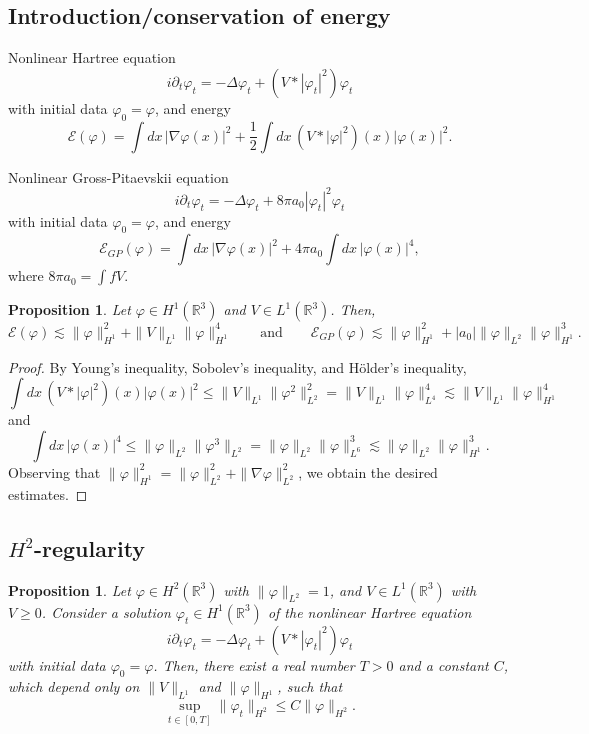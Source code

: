 \documentclass[11pt,a4paper]{scrartcl}
\newtheorem{prp}[thm]{Proposition}
\newcommand{\R}{\mathds{R}}
\begin{document}
\subsection{Introduction/conservation of energy}


Nonlinear Hartree equation
\[
  i \partial_t \varphi_t = - \Delta \varphi_t + (V * |\varphi_t|^2) \varphi_t
\]
with initial data $\varphi_0 = \varphi$, and energy
\[
  \mathcal{E}(\varphi) = \int dx \, |\nabla \varphi(x)|^2 + \frac{1}{2} \int
  dx \, (V * |\varphi|^2)(x) |\varphi(x)|^2.
\]


Nonlinear Gross-Pitaevskii equation
\[
  i \partial_t \varphi_t = - \Delta \varphi_t + 8 \pi a_0 |\varphi_t|^2
  \varphi_t
\]
with initial data $\varphi_0 = \varphi$, and energy
\[
  \mathcal{E}_{GP}(\varphi) = \int dx \, |\nabla \varphi(x)|^2 + 4 \pi a_0
  \int dx \, |\varphi(x)|^4,
\]
where $8 \pi a_0 = \int f V$.


\begin{prp} \label{p:energy}
  Let $\varphi \in H^1(\R^3)$ and $V \in L^1(\R^3)$. Then,
  \[
    \mathcal{E}(\varphi) \apprle \| \varphi \|_{H^1}^2 + \| V \|_{L^1} \|
    \varphi \|_{H^1}^4 \qquad \text{and} \qquad \mathcal{E}_{GP}(\varphi)
    \apprle \| \varphi \|_{H^1}^2 + |a_0| \| \varphi \|_{L^2} \| \varphi
    \|_{H^1}^3.
  \]
\end{prp}


\begin{proof}
  By Young's inequality, Sobolev's inequality, and H\"older's inequality, 
  \[
    \int dx \, (V * |\varphi|^2)(x) |\varphi(x)|^2 \le \| V \|_{L^1} \|
    \varphi^2 \|_{L^2}^2 = \| V \|_{L^1} \| \varphi \|_{L^4}^4 \apprle \| V
    \|_{L^1} \| \varphi \|_{H^1}^4
  \]
  and
  \[
    \int dx \, |\varphi(x)|^4 \le \| \varphi \|_{L^2} \| \varphi^3 \|_{L^2} =
    \| \varphi \|_{L^2} \| \varphi \|_{L^6}^3 \apprle \| \varphi \|_{L^2} \|
    \varphi \|_{H^1}^3.
  \]
  Observing that $\| \varphi \|_{H^1}^2 = \| \varphi \|_{L^2}^2 + \| \nabla
  \varphi \|_{L^2}^2$, we obtain the desired estimates.
\end{proof}


\subsection{$H^2$-regularity}


\begin{prp} \label{p:reg1}
  Let $\varphi \in H^2(\R^3)$ with $\| \varphi \|_{L^2} = 1$, and $V \in
  L^1(\R^3)$ with $V \ge 0$. Consider a solution $\varphi_t \in H^1(\R^3)$ of
  the nonlinear Hartree equation
  \[
    i \partial_t \varphi_t = - \Delta \varphi_t + (V * |\varphi_t|^2)
    \varphi_t
  \]
  with initial data $\varphi_0 = \varphi$. Then, there exist a real number $T
  > 0$ and a constant $C$, which depend only on $\| V \|_{L^1}$ and $\|
  \varphi \|_{H^1}$, such that
  \[
    \sup_{t \in [0,T]} \| \varphi_t \|_{H^2} \le C \| \varphi \|_{H^2}.
  \]
\end{prp}
\end{document}

